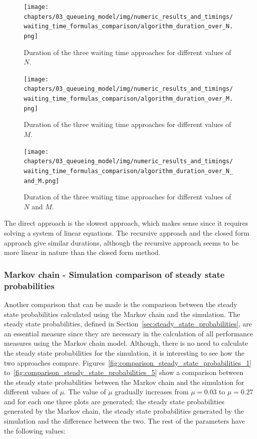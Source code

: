 \begin{figure}[H]
    \texttt{[image: chapters/03\_queueing\_model/img/numeric\_results\_and\_timings/waiting\_time\_formulas\_comparison/algorithm\_duration\_over\_N.png]}
    \caption{Duration of the three waiting time approaches for different values
    of \(N\).}
    \label{fig:waiting_time_algorithm_duration_over_N}
\end{figure}

\begin{figure}[H]
    \texttt{[image: chapters/03\_queueing\_model/img/numeric\_results\_and\_timings/waiting\_time\_formulas\_comparison/algorithm\_duration\_over\_M.png]}
    \caption{Duration of the three waiting time approaches for different values
    of \(M\).}
    \label{fig:waiting_time_algorithm_duration_over_M}
\end{figure}


\begin{figure}[H]
    \texttt{[image: chapters/03\_queueing\_model/img/numeric\_results\_and\_timings/waiting\_time\_formulas\_comparison/algorithm\_duration\_over\_N\_and\_M.png]}
    \caption{Duration of the three waiting time approaches for different values
    of \(N\) and \(M\).}
    \label{fig:waiting_time_algorithm_duration_over_N_and_M}
\end{figure}

The direct approach is the slowest approach, which makes sense since it requires
solving a system of linear equations.
The recursive approach and the closed form approach give similar durations,
although the recursive approach seems to be more linear in nature than the
closed form method. 


\subsubsection{Markov chain - Simulation comparison of steady state probabilities}

Another comparison that can be made is the comparison between the steady state
probabilities calculated using the Markov chain and the simulation.
The steady state probabilities, defined in
Section~\ref{sec:steady_state_probabilities}, are an essential measure since
they are necessary in the calculation of all performance measures using the
Markov chain model.
Although, there is no need to calculate the steady state probabilities for the
simulation, it is interesting to see how the two approaches compare.
Figures~\ref{fig:comparison_steady_state_probabilities_1}
to~\ref{fig:comparison_steady_state_probabilities_5} show a comparison between
the steady state probabilities between the Markov chain and the simulation
for different values of \(\mu\).
The value of \(\mu\) gradually increases from \(\mu = 0.03\) to \(\mu = 0.27\)
and for each one three plots are generated; the steady state probabilities
generated by the Markov chain, the steady state probabilities generated by the
simulation and the difference between the two.
The rest of the parameters have the following values:

